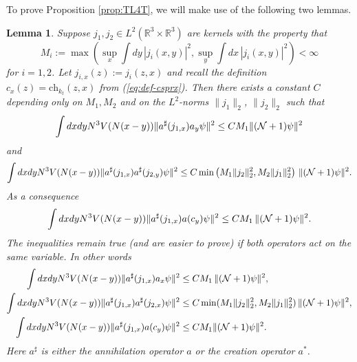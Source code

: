 \documentclass[11pt,a4paper]{article}
\newtheorem{lemma}[thm]{Lemma}
\newcommand{\bR}{{\mathbb R}}
\newcommand{\cN}{{\cal N}}
\begin{document}
To prove Proposition \ref{prop:TL4T}, we will make use of the following two lemmas.
\begin{lemma}\label{lm:4}
Suppose $j_1, j_2 \in L^2 (\bR^3 \times \bR^3)$ are kernels with the property that 
\[ M_i  := \max \left( \sup_x \int dy \, |j_i (x,y)|^2 , \sup_y \int dx \, |j_i (x,y)|^2 \right) < \infty \]
for $i =1 ,2$. Let $j_{i,x} (z) := j_i (z,x)$ and recall the definition $c_x
(z) = \text{ch}_{k_t} (z,x)$ from (\ref{eq:def-csprx}). Then there exists a
constant $C$ depending only on $M_1, M_2$ and on the $L^2$-norms $\| j_1
\|_2$, $\| j_2 \|_2$ such that
\begin{equation}\label{eq:lm4-1}
\int dx dy N^3 V (N (x-y)) \| a^\sharp (j_{1,x}) a_y \psi \|^2 \leq C M_1 \| (\cN+1) \psi \|^2
\end{equation}
and 
\begin{equation}\label{eq:lm4-2}
\int dx dy N^3 V(N (x-y)) \| a^\sharp (j_{1,x}) a^\sharp (j_{2,y}) \psi \|^2 \leq C \min \left(M_1 \| j_2 \|^2_2 , M_2 \| j_1 \|_2^2 \right) \, \| (\cN+1) \psi \|^2 .
\end{equation}
As a consequence
\begin{equation}\label{eq:lm4-3}
\int dx dy N^3 V (N (x-y)) \| a^\sharp (j_{1,x}) a (c_y) \psi \|^2 \leq C M_1 \, \| (\cN+1) \psi \|^2. \end{equation}
The inequalities remain true (and are easier to prove) if both operators act on the same variable. In other words
\begin{equation}\label{eq:lm4-4}
\begin{split}
\int dx dy N^3 V (N (x-y)) \| a^\sharp (j_{1,x}) a_x \psi \|^2 &\leq C M_1
\, \| (\cN+1) \psi \|^2, \\
\int dx dy N^3 V(N (x-y)) \| a^\sharp (j_{1,x}) a^\sharp (j_{2,x}) \psi \|^2
&\leq C \min (M_1 \|j_2 \|_2^2 , M_2 \|j_1\|_2^2 ) \, \| (\cN+1) \psi \|^2, \\
\int dx dy N^3 V (N (x-y)) \| a^\sharp (j_{1,x}) a (c_y) \psi \|^2 &\leq C M_1  \| (\cN+1) \psi \|^2.
\end{split}
\end{equation}
Here $a^\sharp$ is either the annihilation operator $a$ or the creation operator $a^*$. 
\end{lemma}
\end{document}

